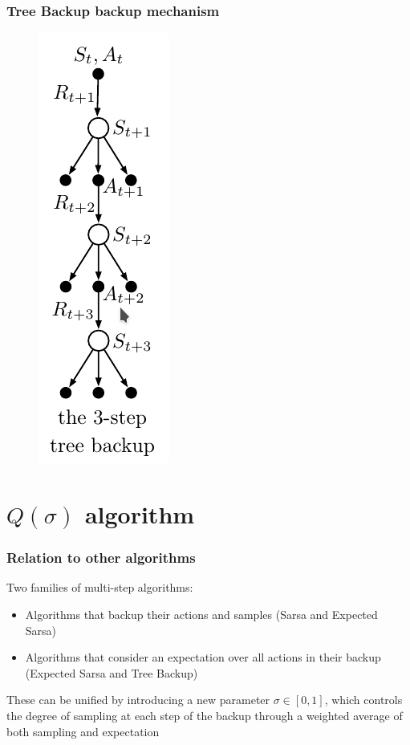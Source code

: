 \documentclass{beamer}
\begin{document}
\begin{frame}
  \frametitle{Tree Backup backup mechanism}
  \begin{figure}
    \centering
    \includegraphics[height=0.7 \textheight]{tree-backup}
  \end{figure}
\end{frame}

\section{$Q(\sigma)$ algorithm}

\begin{frame}
  \frametitle{Relation to other algorithms}
  Two families of multi-step algorithms:
  \begin{itemize}
    \item Algorithms that backup their actions and samples (Sarsa and
      Expected Sarsa)
    \item Algorithms that consider an expectation over all actions in their
      backup (Expected Sarsa and Tree Backup)
  \end{itemize}
  These can be unified by introducing a new parameter $\sigma \in [0, 1]$, which
  controls the degree of sampling at each step of the backup through a weighted
  average of both sampling and expectation
\end{frame}
\end{document}
